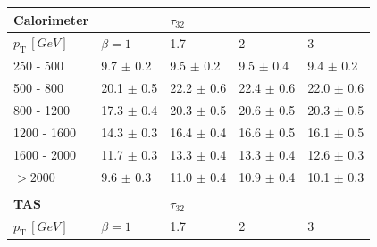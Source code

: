 \begin{table}[]
\centering
\begin{tabular}{lllll}
 \multicolumn{1}{l||}{\textbf{Calorimeter}}    &                                & $\tau_{32}$               &                           & \multicolumn{1}{l|}{}     \\ \hline
\multicolumn{1}{l||}{$p_{\mathrm{T}} \, [GeV]$} & \multicolumn{1}{l|}{$\beta=1$} & \multicolumn{1}{l|}{1.7}  & \multicolumn{1}{l|}{2}    & \multicolumn{1}{l|}{3}    \\ \hline \hline
\multicolumn{1}{l||}{250 - 500}      & \multicolumn{1}{l|}{9.7 $\pm$ 0.2}       	& \multicolumn{1}{l|}{9.5 $\pm$ 0.2}  					& \multicolumn{1}{l|}{9.5 $\pm$ 0.4}  					& \multicolumn{1}{l|}{9.4 $\pm$ 0.2}  \\
\multicolumn{1}{l||}{500 - 800}      & \multicolumn{1}{l|}{20.1 $\pm$ 0.5}      					& \multicolumn{1}{l|}{22.2 $\pm$ 0.6} 					& \multicolumn{1}{l|}{22.4 $\pm$ 0.6} & \multicolumn{1}{l|}{22.0 $\pm$ 0.6} \\
\multicolumn{1}{l||}{800 - 1200}     & \multicolumn{1}{l|}{17.3 $\pm$ 0.4}      					& \multicolumn{1}{l|}{20.3 $\pm$ 0.5} 					& \multicolumn{1}{l|}{20.6 $\pm$ 0.5} & \multicolumn{1}{l|}{20.3 $\pm$ 0.5} \\
\multicolumn{1}{l||}{1200 - 1600}    & \multicolumn{1}{l|}{14.3 $\pm$ 0.3}      					& \multicolumn{1}{l|}{16.4 $\pm$ 0.4} 					& \multicolumn{1}{l|}{16.6 $\pm$ 0.5} & \multicolumn{1}{l|}{16.1 $\pm$ 0.5} \\
\multicolumn{1}{l||}{1600 - 2000}    & \multicolumn{1}{l|}{11.7 $\pm$ 0.3}      					& \multicolumn{1}{l|}{13.3 $\pm$ 0.4} & \multicolumn{1}{l|}{13.3 $\pm$ 0.4} & \multicolumn{1}{l|}{12.6 $\pm$ 0.3} \\
\multicolumn{1}{l||}{$>2000$}        & \multicolumn{1}{l|}{9.6 $\pm$ 0.3}       					& \multicolumn{1}{l|}{11.0 $\pm$ 0.4} & \multicolumn{1}{l|}{10.9 $\pm$ 0.4} 					& \multicolumn{1}{l|}{10.1 $\pm$ 0.3} \\ \hline
                                    &                                &                           &                           &                           \\
 \multicolumn{1}{l||}{\textbf{TAS}}            &                                & $\tau_{32}$               &                           & \multicolumn{1}{l|}{}     \\ \hline
\multicolumn{1}{l||}{$p_{\mathrm{T}} \, [GeV]$} & \multicolumn{1}{l|}{$\beta=1$} & \multicolumn{1}{l|}{1.7}  & \multicolumn{1}{l|}{2}    & \multicolumn{1}{l|}{3}    \\ \hline \hline

\end{tabular}
\end{table}

